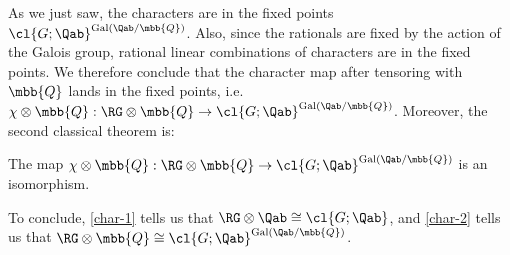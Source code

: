 As we just saw, the characters are in the fixed points $\cl{G; \Qab}^{\Gal\left(\Qab / \mbb{Q}\right)}$.
Also, since the rationals are fixed by the action of the Galois group, rational linear combinations of characters are in the fixed points.
We therefore conclude that the character map after tensoring with $\mbb{Q}$ lands in the fixed points, i.e. $\chi \otimes \mbb{Q}: \RG \otimes \mbb{Q} \to \cl{G; \Qab}^{\Gal\left(\Qab / \mbb{Q}\right)}$.
Moreover, the second classical theorem is:

\begin{theorem}\label{char-2}
	The map $\chi \otimes \mbb{Q}: \RG \otimes \mbb{Q} \to \cl{G; \Qab}^{\Gal\left(\Qab / \mbb{Q}\right)}$ is an isomorphism.
\end{theorem}

To conclude, \ref{char-1} tells us that $\RG \otimes \Qab \cong \cl{G; \Qab}$, and \ref{char-2} tells us that $\RG \otimes \mbb{Q} \cong \cl{G; \Qab}^{\Gal\left(\Qab / \mbb{Q}\right)}$.
